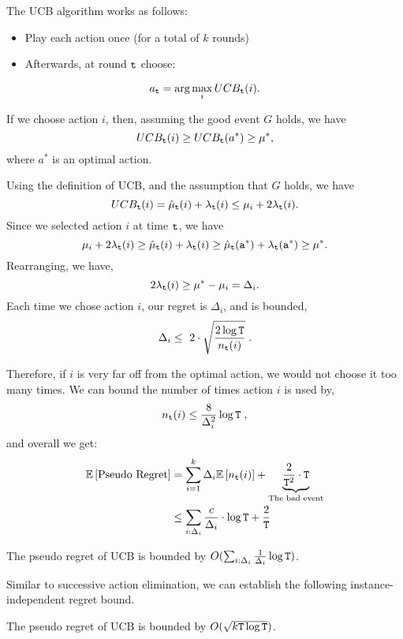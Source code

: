 The UCB  algorithm works as
follows:
\begin{itemize}
\item Play each action once (for a total of $k$ rounds)
\item Afterwards, at round ${\tt t}$ choose:
\end{itemize}
\[
a_{{\tt t}}=\arg\max_{i}UCB_{{\tt t}}(i).
\]


If we choose action $i$, then, assuming the good event $G$ holds, we have
\[
UCB_{{\tt t}}(i)  \ge  UCB_{{\tt t}}(a^*)\geq\mu^{*},
\]
where $a^*$ is an optimal action.

Using the definition of UCB, and the assumption that $G$ holds, we have
\[
UCB_{{\tt t}}(i)=\hat{\mu}_{{\tt t}}(i)+\lambda_{{\tt t}}(i)\le\mu_{i}+2\lambda_{{\tt t}}(i).
\]
Since we selected action $i$ at time ${\tt t}$, we have
\[
\mu_{i}+2\lambda_{{\tt t}}(i)\ge \hat{\mu}_{\tt t} (i)+\lambda_{{\tt t}}(i)\geq \hat{\mu}_{\tt t} ({\tt a}^*)+\lambda_{{\tt t}}({\tt a}^*)\geq \mu^{*}.
\]
Rearranging, we have,
\[
2\lambda_{{\tt t}}(i)\ge\mu^{*}-\mu_{i}=\Delta_{i}.
\]
Each time we chose action $i$, our regret is $\Delta_i $, and is bounded, 
\[
\Delta_{i}\leq\text{ }2\cdot\sqrt{\frac{2\log {\tt T}}{n_{{\tt t}}(i)}}\;.
\]

Therefore, if $i$ is very far off from the optimal action, we
would not choose it too many times. We can bound the number of times
action $i$ is used by,
\[
n_{{\tt t}}(i)\leq\frac{8}{\Delta_{i}^{2}}\log {\tt T}\;,
\]
and overall we get:
\begin{align*}
\mathbb{E}\left[\text{Pseudo Regret}\right] & =
\sum_{i=1}^{k}\Delta_{i}\mathbb{E}\left[n_{{\tt t}}(i)\right]+\underbrace{\frac{2}{{\tt T}^{2}}\cdot
{\tt T}}_{\text{The bad event}}
\\
 & \le  \sum_{i:\Delta_i}\frac{c}{\Delta_{i}}\cdot\log {\tt T}+\frac{2}{{\tt T}}
\end{align*}

\begin{theorem}
\label{thm:MAB:UCB1}
The pseudo regret of UCB is bounded by $O(\sum_{i:\Delta_i}\frac{1}{\Delta_{i}}\log {\tt T})$.
\end{theorem}

Similar to successive action elimination, we can establish the following instance-independent regret bound. 

\begin{theorem}
\label{thm:MAB:UCB2}
The pseudo regret of UCB is bounded by $O( \sqrt{k{\tt T}\log{\tt T}})$.
\end{theorem}

